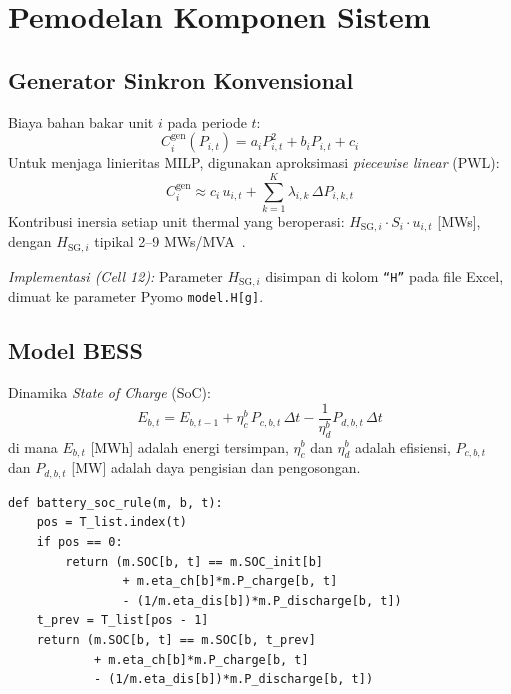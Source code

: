 \documentclass[journal]{IEEEtran}
\begin{document}
\section{Pemodelan Komponen Sistem}
\label{sec:model}

\subsection{Generator Sinkron Konvensional}

Biaya bahan bakar unit $i$ pada periode $t$:
\begin{equation}
  C_i^{\mathrm{gen}}(P_{i,t}) = a_i P_{i,t}^2 + b_i P_{i,t} + c_i
  \label{eq:fuel_cost}
\end{equation}
Untuk menjaga linieritas MILP, digunakan aproksimasi
\textit{piecewise linear} (PWL):
\begin{equation}
  C_i^{\mathrm{gen}} \approx
    c_i\,u_{i,t} + \sum_{k=1}^{K} \lambda_{i,k}\,\Delta P_{i,k,t}
  \label{eq:pwl}
\end{equation}
Kontribusi inersia setiap unit thermal yang beroperasi:
$H_{\mathrm{SG},i} \cdot S_i \cdot u_{i,t}$ [MWs],
dengan $H_{\mathrm{SG},i}$ tipikal 2--9 MWs/MVA~\cite{Kundur1994}.

\textit{Implementasi (Cell 12):} Parameter $H_{\mathrm{SG},i}$
disimpan di kolom \texttt{``H''} pada file Excel, dimuat ke
parameter Pyomo \texttt{model.H[g]}.

\subsection{Model BESS}

Dinamika \textit{State of Charge} (SoC):
\begin{equation}
  E_{b,t} = E_{b,t-1}
    + \eta_c^b \, P_{c,b,t}\,\Delta t
    - \frac{1}{\eta_d^b} P_{d,b,t}\,\Delta t
  \label{eq:soc}
\end{equation}
di mana $E_{b,t}$ [MWh] adalah energi tersimpan, $\eta_c^b$
dan $\eta_d^b$ adalah efisiensi, $P_{c,b,t}$ dan $P_{d,b,t}$
[MW] adalah daya pengisian dan pengosongan.

\begin{lstlisting}[style=pycode,caption={Dinamika SoC BESS (Cell 52)}]
def battery_soc_rule(m, b, t):
    pos = T_list.index(t)
    if pos == 0:
        return (m.SOC[b, t] == m.SOC_init[b]
                + m.eta_ch[b]*m.P_charge[b, t]
                - (1/m.eta_dis[b])*m.P_discharge[b, t])
    t_prev = T_list[pos - 1]
    return (m.SOC[b, t] == m.SOC[b, t_prev]
            + m.eta_ch[b]*m.P_charge[b, t]
            - (1/m.eta_dis[b])*m.P_discharge[b, t])
\end{lstlisting}
\end{document}
